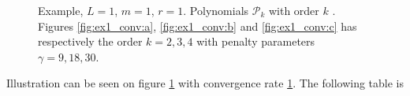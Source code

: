 \begin{figure}
    \caption{ Example, $L=1$, $m=1$, $r=1$. Polynomials $\mathcal{P}_{k} $ with order $k$ . Figures \ref{fig:ex1_conv:a}, \ref{fig:ex1_conv:b} and \ref{fig:ex1_conv:c} has respectively the order $k=2,3, 4$ with penalty parameters $\gamma = 9,18,30 $.  }
    \label{fig:ex1_conv}
\end{figure}

Illustration can be seen on figure \ref{fig:ex1_conv} with convergence rate \ref{fig:ex1_conv}. The following table is

